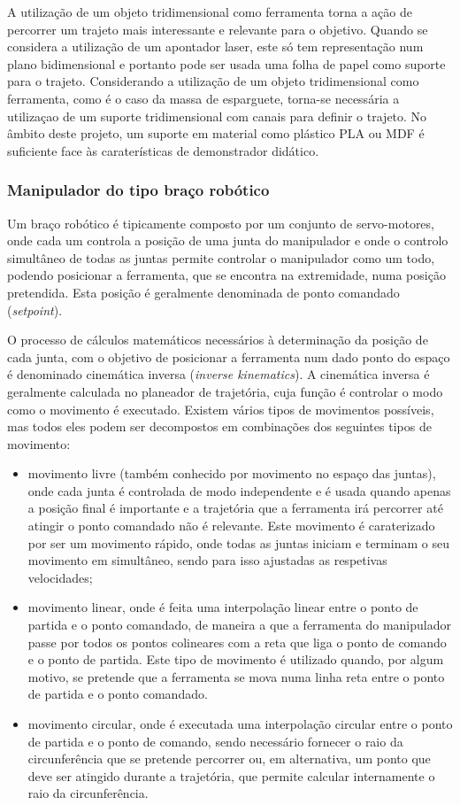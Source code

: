 A utilização de um objeto tridimensional como ferramenta torna a ação de
percorrer um trajeto mais interessante e relevante para o objetivo.
Quando se considera a utilização de um apontador laser, este só tem
representação num plano bidimensional e portanto pode ser usada uma folha
de papel como suporte para o trajeto. Considerando a utilização de um
objeto tridimensional como ferramenta, como é o caso da massa de
esparguete, torna-se necessária a utilizaçao de um suporte tridimensional
com canais para definir o trajeto. No âmbito deste projeto, um suporte
em material como plástico PLA ou MDF é suficiente face às caraterísticas
de demonstrador didático.

\subsubsection{Manipulador do tipo braço robótico}
Um braço robótico é tipicamente composto por um conjunto de servo-motores,
onde cada um controla a posição de uma junta do manipulador e onde o
controlo simultâneo de todas as juntas permite controlar o manipulador
como um todo, podendo posicionar a ferramenta, que se encontra na extremidade,
numa posição pretendida. Esta posição é geralmente denominada de ponto
comandado (\emph{setpoint}).

O processo de cálculos matemáticos necessários à determinação da posição
de cada junta, com o objetivo de posicionar a ferramenta num dado ponto
do espaço é denominado cinemática inversa  (\emph{inverse kinematics}).
A cinemática inversa é geralmente calculada no planeador de trajetória,
cuja função é controlar o modo como o movimento é executado. Existem vários
tipos de movimentos possíveis, mas todos eles podem ser decompostos em
combinações dos seguintes tipos de movimento:

\begin{itemize}
 \item movimento livre (também conhecido por movimento no espaço das
 juntas), onde cada junta é controlada de modo independente e é usada
 quando apenas a posição final é importante e a trajetória que a ferramenta
 irá percorrer até atingir o ponto comandado não é relevante. Este movimento
 é caraterizado por ser um movimento rápido, onde todas as juntas iniciam
 e terminam o seu movimento em simultâneo, sendo para isso ajustadas as
 respetivas velocidades;
 \item movimento linear, onde é feita uma interpolação linear entre o
 ponto de partida e o ponto comandado, de maneira a que a ferramenta do
 manipulador passe por todos os pontos colineares com a reta que liga
 o ponto de comando e o ponto de partida. Este tipo de movimento é utilizado
 quando, por algum motivo, se pretende que a ferramenta se mova numa linha
 reta entre o ponto de partida e o ponto comandado.
 \item movimento circular, onde é executada uma interpolação circular
 entre o ponto de partida e o ponto de comando, sendo necessário fornecer
 o raio da circunferência que se pretende percorrer ou, em alternativa,
 um ponto que deve ser atingido durante a trajetória, que permite calcular
 internamente o raio da circunferência.
\end{itemize}

